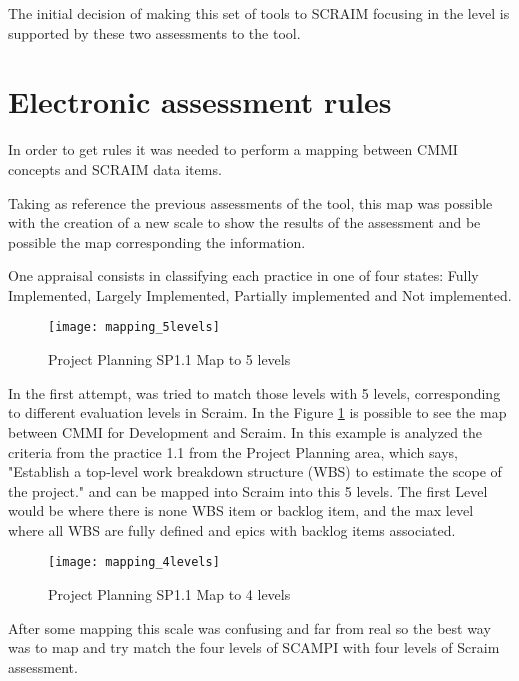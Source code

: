 The initial decision of making this set of tools to SCRAIM focusing in the level is supported by these two assessments to the tool.



\section{Electronic assessment rules} \label{sec:mapping}

In order to get rules it was needed to perform a mapping between CMMI concepts and SCRAIM data items. 

Taking as reference the previous assessments of the tool, this map was possible with the creation of a new scale to show the results of the assessment and be possible the map corresponding the information.

One appraisal consists in classifying each practice in one of four states: Fully Implemented, Largely Implemented, Partially implemented and Not implemented.

\begin{figure}[h]
	\begin{center}
		\leavevmode
		\texttt{[image: mapping\_5levels]}
		\caption{Project Planning SP1.1 Map to 5 levels}
		\label{fig:mapping_5levels}
	\end{center}
\end{figure}

In the first attempt, was tried to match those levels with 5 levels, corresponding to different evaluation levels in Scraim. In the Figure \ref{fig:mapping_5levels} is possible to see the map between CMMI for Development and Scraim. In this example is analyzed the criteria from the practice 1.1 from the Project Planning area, which says, "Establish a top-level work breakdown structure (WBS) to estimate the scope of the project." and can be mapped into Scraim into this 5 levels. The first Level would be where there is none WBS item or backlog item, and the max level where all WBS are fully defined and epics with backlog items associated. 

\begin{figure}[h]
	\begin{center}
		\leavevmode
		\texttt{[image: mapping\_4levels]}
		\caption{Project Planning SP1.1 Map to 4 levels}
		\label{fig:mapping_4levels}
	\end{center}
\end{figure}

After some mapping this scale was confusing and far from real so the best way was to map and try match the four levels of SCAMPI with four levels of Scraim assessment.

